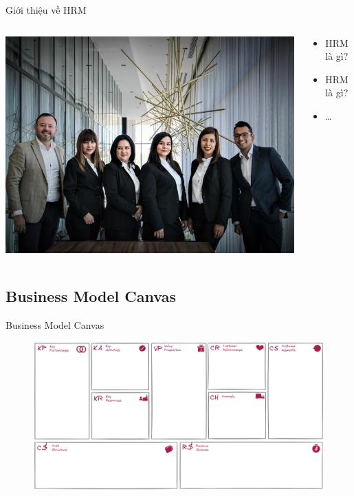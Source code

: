 \documentclass{beamer}
\begin{document}
\begin{frame}{Giới thiệu về HRM}
\begin{columns}

\begin{column}{0.4\textwidth}
\includegraphics[width=\textwidth]{pictures/Giới thiệu về HRM.jpg}
\end{column}

\begin{column}{0.6\textwidth}
\begin{itemize}
\item HRM là gì?
\item HRM là gì?
\item \dots
\end{itemize}
\end{column}

\end{columns}
\end{frame}
\subsection{Business Model Canvas}
\begin{frame}{Business Model Canvas}
\begin{figure}[H]
\centering
\includegraphics[scale = 0.2]{pictures/Business Model Canvas.excalidraw.png}
\end{figure}
\end{frame}
\end{document}
